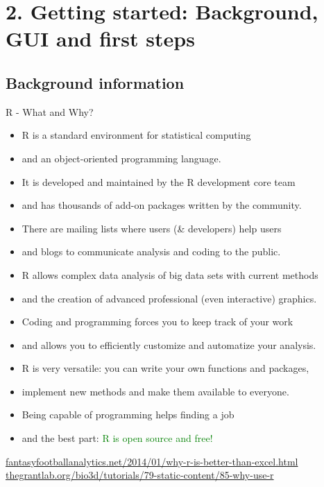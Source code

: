 \documentclass[xcolor=table,           xcolor=dvipsnames]{beamer}\usepackage[]{graphicx}\usepackage[]{color}
\begin{document}
\section{2. Getting started: Background, GUI and first steps}

\subsection{Background information}

\begin{frame}{R - What and Why?}
\pause
\begin{itemize}%
\item R is a standard environment for statistical computing
\item and an object-oriented programming language.
\item It is developed and maintained by the R development core team
\item and has thousands of add-on packages written by the community.
\item There are mailing lists where users (\& developers) help users
\item and blogs to communicate analysis and coding to the public.
\item R allows complex data analysis of big data sets with current methods
\item and the creation of advanced professional (even interactive) graphics.
\item Coding and programming forces you to keep track of your work
\item and allows you to efficiently customize and automatize your analysis.
\item R is very versatile: you can write your own functions and packages,
\item implement new methods and make them available to everyone.
\item Being capable of programming helps finding a job
\item and the best part: \textcolor{green}{R is open source and free!}
\end{itemize}
\pause
\small \href{http://fantasyfootballanalytics.net/2014/01/why-r-is-better-than-excel.html}{fantasyfootballanalytics.net/2014/01/why-r-is-better-than-excel.html}
\href{http://thegrantlab.org/bio3d/tutorials/79-static-content/85-why-use-r}{thegrantlab.org/bio3d/tutorials/79-static-content/85-why-use-r}
\end{frame}
\end{document}

